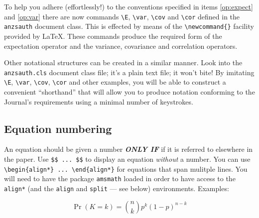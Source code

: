 \documentclass[
doublespace,
  times]{anzsauth}
\begin{document}
To help you adhere (effortlessly!) to the conventions specified in items
\ref{op:expect} and \ref{op:var} there are now commands
\texttt{\textbackslash{}E}, \texttt{\textbackslash{}var},
\texttt{\textbackslash{}cov} and \texttt{\textbackslash{}cor} defined in
the \texttt{anzsauth} document class. This is effected by means of the
\texttt{\textbackslash{}newcommand\{\}} facility provided by \LaTeX.
These commands produce the required form of the expectation operator and
the variance, covariance and correlation operators.

Other notational structures can be created in a similar manner. Look
into the \texttt{anzsauth.cls} document class file; it's a plain text
file; it won't bite! By imitating \texttt{\textbackslash{}E},
\texttt{\textbackslash{}var}, \texttt{\textbackslash{}cov},
\texttt{\textbackslash{}cor} and other examples, you will be able to
construct a convenient ``shorthand'' that will allow you to produce
notation conforming to the Journal's requirements using a minimal number
of keystrokes.

\subsection{Equation numbering}\label{sec-eqnNumb}

An equation should be given a number \textbf{\emph{ONLY IF}} if it is
referred to elsewhere in the paper. Use \texttt{\$\$\ ...\ \$\$} to
display an equation \emph{without} a number. You can use
\texttt{\textbackslash{}begin\{align*\}\ ...\ \textbackslash{}end\{align*\}}
for equations that span mulitple lines. You will need to have the
package \texttt{amsmath} loaded in order to have access to the
\texttt{align*} (and the \texttt{align} and \texttt{split} --- see
below) environments. Examples:

\[\Pr(K = k) = \binom{n}{k} p^k (1-p)^{n-k}\]
\end{document}
